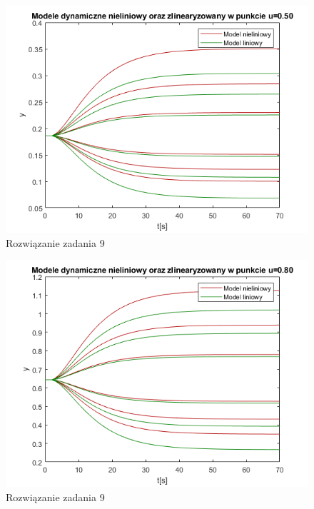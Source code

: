 \begin{figure}[H]
\centering
\includegraphics[width=15cm]{images/12.png}
\caption{Rozwiązanie zadania 9}
\label{fig:12}
\end{figure}
\begin{figure}[H]
\centering
\includegraphics[width=15cm]{images/13.png}
\caption{Rozwiązanie zadania 9}
\label{fig:13}
\end{figure}
